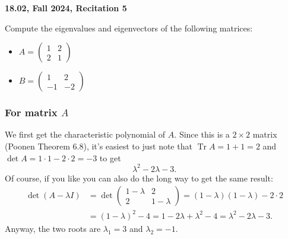 \documentclass[addpoints, 12pt,answers]{exam}
\begin{document}
\begin{center}
{\bf 18.02, Fall 2024, Recitation 5}
\end{center}

\vspace{5 mm}

\begin{questions}


\question Compute the eigenvalues and eigenvectors of the following matrices:
\begin{itemize}
\item $A = \begin{pmatrix} 1 & 2\\2 & 1\end{pmatrix}$
\item $B =  \begin{pmatrix} 1 & 2\\-1 & -2\end{pmatrix}$
\end{itemize}
\begin{solution}
\subsubsection*{For matrix $A$}
We first get the characteristic polynomial of $A$.
Since this is a $2 \times 2$ matrix (Poonen Theorem 6.8), it's easiest to just note that
$\operatorname{Tr} A = 1+1 = 2$ and $\det A = 1 \cdot 1 - 2 \cdot 2 = -3$ to get
\[ \lambda^2 - 2 \lambda - 3. \]
Of course, if you like you can also do the long way to get the same result:
\begin{align*}
  \det(A - \lambda I) &= \det\begin{pmatrix} 1 - \lambda & 2 \\ 2 & 1 - \lambda \end{pmatrix} = (1 - \lambda)(1 - \lambda) - 2 \cdot 2 \\
  &= (1 - \lambda)^2 - 4 = 1 - 2\lambda + \lambda^2 - 4 = \lambda^2 - 2\lambda - 3.
\end{align*}
Anyway, the two roots are $\lambda_1 = 3$ and $\lambda_2 = -1$.


\end{solution}
\end{questions}
\end{document}
